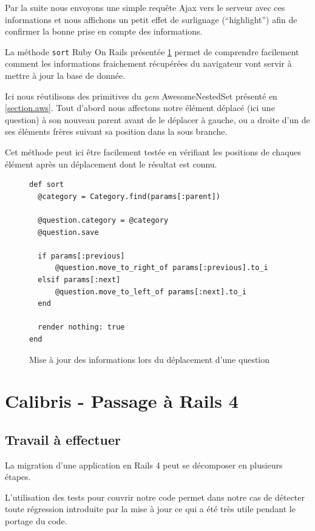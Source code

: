 \documentclass[12pt,a4paper]{book}
\begin{document}
Par la suite nous envoyons une simple requête Ajax vers le serveur avec ces informations et nous affichons un petit effet de surlignage (``highlight'') afin de confirmer la bonne prise en compte des informations.

La méthode \texttt{sort} Ruby On Rails présentée \cref{fig.sort3} permet de comprendre facilement comment les informations fraichement récupérées du navigateur vont servir à mettre à jour la base de donnée. 

Ici nous réutilisons des primitives du \textit{gem} AwesomeNestedSet présenté en \cref{section.aws}. Tout d'abord nous affectons notre élément déplacé (ici une question) à son nouveau parent avant de le déplacer à gauche, ou a droite d'un de ses éléments frères suivant sa position dans la sous branche.

Cet méthode peut ici être facilement testée en vérifiant les positions de chaques élément après un déplacement dont le résultat est connu.

\begin{figure}[h]
\lstset{language=ruby}
\begin{lstlisting}
def sort
  @category = Category.find(params[:parent])

  @question.category = @category
  @question.save

  if params[:previous]
      @question.move_to_right_of params[:previous].to_i
  elsif params[:next]
      @question.move_to_left_of params[:next].to_i
  end

  render nothing: true
end
\end{lstlisting}
 \caption{Mise à jour des informations lors du déplacement d'une question}
 \label{fig.sort3}
\end{figure}

\section{Calibris - Passage à Rails 4} 

\subsection{Travail à effectuer}

La migration d'une application en Rails 4 peut se décomposer en plusieurs étapes. 

L'utilisation des tests pour couvrir notre code permet dans notre cas de détecter toute régression introduite par la mise à jour ce qui a été très utile pendant le portage du code.
\end{document}
